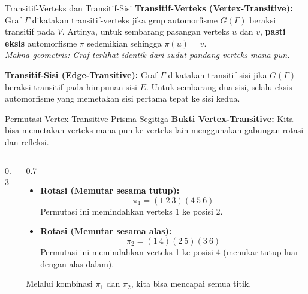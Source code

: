 \documentclass[aspectratio=169]{beamer}
\begin{document}
\begin{frame}{Transitif-Verteks dan Transitif-Sisi}
  \textbf{Transitif-Verteks (Vertex-Transitive):}
  Graf $\Gamma$ dikatakan transitif-verteks jika grup automorfisme $G(\Gamma)$ beraksi transitif pada $V$. Artinya, untuk sembarang pasangan verteks $u$ dan $v$, \textbf{pasti eksis} automorfisme $\pi$ sedemikian sehingga $\pi(u) = v$.
  \\ \textit{Makna geometris: Graf terlihat identik dari sudut pandang verteks mana pun.}

  \vspace{0.5cm}
  \textbf{Transitif-Sisi (Edge-Transitive):}
  Graf $\Gamma$ dikatakan transitif-sisi jika $G(\Gamma)$ beraksi transitif pada himpunan sisi $E$. Untuk sembarang dua sisi, selalu eksis automorfisme yang memetakan sisi pertama tepat ke sisi kedua.
\end{frame}

\begin{frame}[fragile]{Permutasi Vertex-Transitive Prisma Segitiga}
  \textbf{Bukti Vertex-Transitive:}
  Kita bisa memetakan verteks mana pun ke verteks lain menggunakan gabungan rotasi dan refleksi.
  \begin{columns}
    \begin{column}{0.3\textwidth}
    \end{column}

    \begin{column}{0.7\textwidth}
      \small
      \begin{itemize}
        \item \textbf{Rotasi (Memutar sesama tutup):}
              $$ \pi_1 = (1\ 2\ 3)(4\ 5\ 6) $$
              Permutasi ini memindahkan verteks 1 ke posisi 2.

        \item \textbf{Rotasi (Memutar sesama alas):}
              $$ \pi_2 = (1\ 4)(2\ 5)(3\ 6) $$
              Permutasi ini memindahkan verteks 1 ke posisi 4 (menukar tutup luar dengan alas dalam).
      \end{itemize}
      Melalui kombinasi $\pi_1$ dan $\pi_2$, kita bisa mencapai semua titik.
    \end{column}
  \end{columns}
\end{frame}
\end{document}
